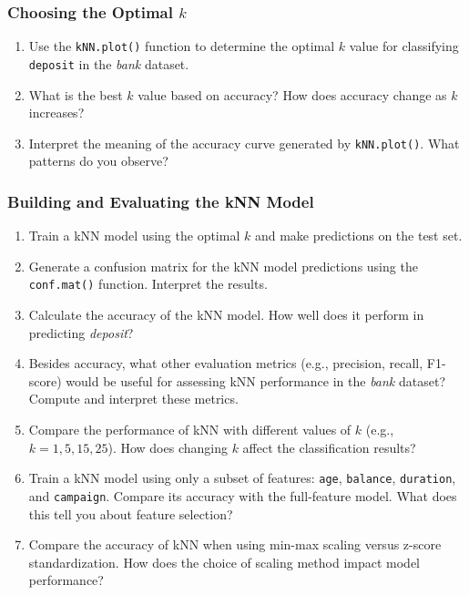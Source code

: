 \documentclass[
  11pt,
]{book}
\providecommand{\tightlist}{%
  \setlength{\itemsep}{0pt}\setlength{\parskip}{0pt}}
\theoremstyle{definition}
\theoremstyle{definition}
\theoremstyle{definition}
\theoremstyle{definition}
\theoremstyle{remark}
\begin{document}
\subsubsection*{\texorpdfstring{Choosing the Optimal \(k\)}{Choosing the Optimal k}}\label{choosing-the-optimal-k}


\begin{enumerate}
\def\labelenumi{\arabic{enumi}.}
\setcounter{enumi}{16}
\tightlist
\item
  Use the \texttt{kNN.plot()} function to determine the optimal \(k\) value for classifying \texttt{deposit} in the \emph{bank} dataset.\\
\item
  What is the best \(k\) value based on accuracy? How does accuracy change as \(k\) increases?
\item
  Interpret the meaning of the accuracy curve generated by \texttt{kNN.plot()}. What patterns do you observe?
\end{enumerate}

\subsubsection*{Building and Evaluating the kNN Model}\label{building-and-evaluating-the-knn-model}


\begin{enumerate}
\def\labelenumi{\arabic{enumi}.}
\setcounter{enumi}{19}
\tightlist
\item
  Train a kNN model using the optimal \(k\) and make predictions on the test set.\\
\item
  Generate a confusion matrix for the kNN model predictions using the \texttt{conf.mat()} function. Interpret the results.\\
\item
  Calculate the accuracy of the kNN model. How well does it perform in predicting \emph{deposit}?\\
\item
  Besides accuracy, what other evaluation metrics (e.g., precision, recall, F1-score) would be useful for assessing kNN performance in the \emph{bank} dataset? Compute and interpret these metrics.\\
\item
  Compare the performance of kNN with different values of \(k\) (e.g., \(k = 1, 5, 15, 25\)). How does changing \(k\) affect the classification results?\\
\item
  Train a kNN model using only a subset of features: \texttt{age}, \texttt{balance}, \texttt{duration}, and \texttt{campaign}. Compare its accuracy with the full-feature model. What does this tell you about feature selection?\\
\item
  Compare the accuracy of kNN when using min-max scaling versus z-score standardization. How does the choice of scaling method impact model performance?
\end{enumerate}
\end{document}
